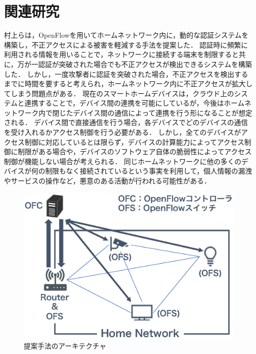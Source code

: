 \documentclass[a4paper,10pt,twocolumn,uplatex]{jsarticle}
\begin{document}
\section{関連研究}
村上らは，OpenFlowを用いてホームネットワーク内に，動的な認証システムを構築し，不正アクセスによる被害を軽減する手法を提案した\cite{related}．
認証時に頻繁に利用される情報を用いることで，ネットワークに接続する端末を制限すると共に，万が一認証が突破された場合でも不正アクセスが検出できるシステムを構築した．
しかし，一度攻撃者に認証を突破された場合，不正アクセスを検出するまでに時間を要すると考えられ，ホームネットワーク内に不正アクセスが拡大してしまう問題点がある．
現在のスマートホームデバイスは，クラウド上のシステムと連携することで，デバイス間の連携を可能にしているが，今後はホームネットワーク内で閉じたデバイス間の通信によって連携を行う形になることが想定される\cite{d2d}．
デバイス間で直接通信を行う場合，各デバイスでどのデバイスの通信を受け入れるかアクセス制御を行う必要がある．
しかし，全てのデバイスがアクセス制御に対応しているとは限らず，デバイスの計算能力によってアクセス制御に制限がある場合や，デバイスのソフトウェア自体の脆弱性によってアクセス制御が機能しない場合が考えられる．
同じホームネットワークに他の多くのデバイスが何の制限もなく接続されているという事実を利用して，個人情報の漏洩やサービスの操作など，悪意のある活動が行われる可能性がある\cite{disap}．

\begin{figure}[!tb]
  \centering
  \includegraphics[width=\linewidth]{img/architecture.eps}
  \caption{提案手法のアーキテクチャ}
  \label{fig:architecture}
\end{figure}
\end{document}
